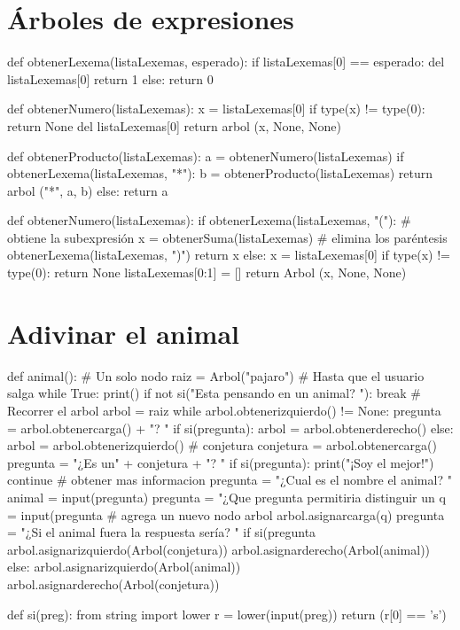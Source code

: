 \section{Árboles de expresiones}

\begin{pythoncode}
def obtenerLexema(listaLexemas, esperado):
  if listaLexemas[0] == esperado:
      del listaLexemas[0]
      return 1
  else:
      return 0

def obtenerNumero(listaLexemas):
  x = listaLexemas[0]
  if type(x) != type(0):
      return None
  del listaLexemas[0]
  return arbol (x, None, None)


def obtenerProducto(listaLexemas):
  a = obtenerNumero(listaLexemas)
  if obtenerLexema(listaLexemas, "*"):
    b = obtenerProducto(listaLexemas) 
    return arbol ("*", a, b)
  else:
    return a

def obtenerNumero(listaLexemas):
  if obtenerLexema(listaLexemas, "("):
    # obtiene la subexpresión
    x = obtenerSuma(listaLexemas) 
    # elimina los paréntesis
    obtenerLexema(listaLexemas, ")") 
    return x
  else:
    x = listaLexemas[0]
    if type(x) != type(0):
      return None
    listaLexemas[0:1] = []
   return Arbol (x, None, None)  
\end{pythoncode}

\section{Adivinar el animal}

\begin{pythoncode}
def animal():
  # Un solo nodo
  raiz = Arbol("pajaro")
      # Hasta que el usuario salga
  while True:
    print()
    if not si("Esta pensando en un animal? "):
    break
    # Recorrer el arbol
    arbol = raiz
    while arbol.obtenerizquierdo() != None:
      pregunta = arbol.obtenercarga() + "? "
      if si(pregunta):
      arbol = arbol.obtenerderecho()
      else:
      arbol = arbol.obtenerizquierdo()
    # conjetura
    conjetura = arbol.obtenercarga()
    pregunta = "¿Es un" + conjetura + "? "
    if si(pregunta):
      print("¡Soy el mejor!")
      continue
    # obtener mas informacion
    pregunta = "¿Cual es el nombre el animal? "
    animal = input(pregunta)
    pregunta = "¿Que pregunta permitiria distinguir 
        un %
    q = input(pregunta %
    # agrega un nuevo nodo arbol
    arbol.asignarcarga(q)
    pregunta = "¿Si el animal fuera %
        la respuesta sería? "
    if si(pregunta %
      arbol.asignarizquierdo(Arbol(conjetura))
      arbol.asignarderecho(Arbol(animal))
    else:
      arbol.asignarizquierdo(Arbol(animal))
      arbol.asignarderecho(Arbol(conjetura))

def si(preg):
  from string import lower
  r = lower(input(preg))
  return (r[0] == 's')
\end{pythoncode}

